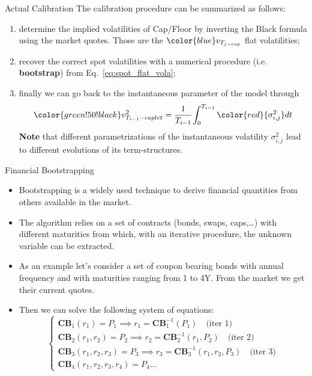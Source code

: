 \documentclass{beamer}
\begin{document}
\begin{frame}{Actual Calibration}
	The calibration procedure can be summarized as follows:
	\begin{enumerate}
		\item<1-> determine the implied volatilities of Cap/Floor by inverting the Black formula using the market quotes. Those are the ${\color{blue}v_{T_{j-cap}}}$ flat volatilities;
		\item<2-> recover the correct spot volatilities with a numerical procedure (i.e. \textbf{bootstrap}) from Eq.~\ref{eq:spot_flat_vola};
		\item<3-> finally we can go back to the instantaneous parameter of the model through
		\begin{equation}
			{\color{green!50!black}v_{T_{i-1}-caplet}^2} =\cfrac{1}{T_{i-1}} \int_0^{T_{i-1}}{\color{red}{\sigma^2_{i,j}}}dt %
		\end{equation}
		\textbf{Note} that different parametrizations of the instantaneous volatility $\sigma_{i,j}^2$ lead to different evolutions of its term-structures.
	\end{enumerate}
\end{frame}

\begin{frame}{Financial Bootstrapping}
	\begin{itemize}
		\item Bootstrapping is a widely used technique to derive financial quantities from others available in the market.
		\item The algorithm relies on a set of contracts (bonds, swaps, caps,\ldots) with different maturities from which, with an iterative procedure, the unknown variable can be extracted.
		\item As an example let's consider a set of coupon bearing bonds with annual frequency and with maturities ranging from 1 to 4Y. From the market we get their current quotes.
		\item Then we can solve the following system of equations:
		\begin{equation*}
			\begin{cases}
				\textbf{CB}_1(r_1) = P_1 \implies r_1 = \textbf{CB}_1^{-1}(P_1)\quad\text{(iter 1)}\\
				\textbf{CB}_2(r_1, r_2) = P_2 \implies r_2 = \textbf{CB}_2^{-1}(r_1, P_2)\quad\text{(iter 2)} \\
				\textbf{CB}_3(r_1, r_2, r_3) = P_3 \implies r_3 = \textbf{CB}_3^{-1}(r_1, r_2, P_3)\quad\text{(iter 3)} \\
				\textbf{CB}_4(r_1, r_2, r_3, r_4) = P_4 \ldots
			\end{cases}
		\end{equation*}
	\end{itemize}
\end{frame}
\end{document}
